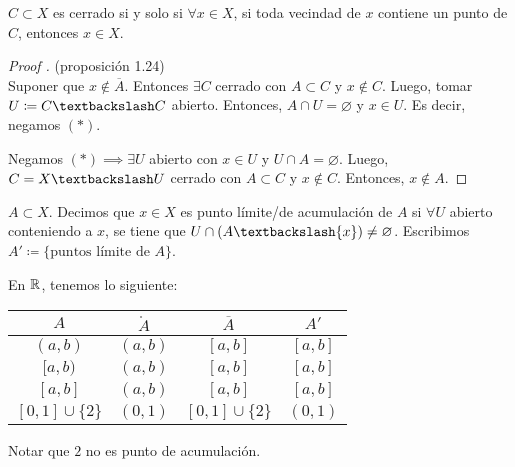 \documentclass[a4paper]{report}
\begin{document}
	\begin{corollary}
		$C \subset X$ es cerrado si y solo si $\forall x \in X$, si toda vecindad de $x$ contiene un punto de $C$, entonces $x \in X$.
	\end{corollary}

	\begin{proof}[Proof ] (proposición 1.24) \\
		\Ifstep Suponer que $x \not\in \overline{A}$. Entonces $\exists C$ cerrado con $A \subset C$ y $x \not\in C$. Luego, tomar $U \coloneq C \textbackslash C$ abierto. Entonces, $A \cap U = \varnothing$ y $x \in U$. Es decir, negamos $(*)$.

		\noindent \Onlyifstep Negamos $(*) \implies \exists U$ abierto con $x \in U$ y $U \cap A = \varnothing$. Luego, $C = X \textbackslash U$ cerrado con $A \subset C$ y $x \not\in C$. Entonces, $x \not\in A$.
	\end{proof}

	\begin{definition}
		$A \subset X$. Decimos que $x \in X$ es punto límite/de acumulación de $A$ si $\forall U$ abierto conteniendo a $x$, se tiene que $U \cap ( A \textbackslash \{ x \} ) \neq \varnothing$. Escribimos $A' \coloneq \{ \text{puntos límite de } A \}$.
	\end{definition}

	\begin{eg}
		En $\mathbb{R}$, tenemos lo siguiente:
		\begin{center}
		\begin{tabular}{ | c | c | c | c | }
			\hline
			$A$ & $\mathring{A}$ & $\overline{A}$ & $A'$ \\
			\hline
			$(a,b)$ & $(a,b)$ & $[a,b]$ & $[a,b]$ \\
			$[a,b)$ & $(a,b)$ & $[a,b]$ & $[a,b]$ \\
			$[a,b]$ & $(a,b)$ & $[a,b]$ & $[a,b]$ \\
			$[0,1] \cup \{2\}$ & $(0,1)$ & $[0,1] \cup \{2\}$ & $(0,1)$ \\
			\hline
		\end{tabular}
		\end{center}
		\noindent Notar que $2$ no es punto de acumulación.
	\end{eg}



\end{document}
